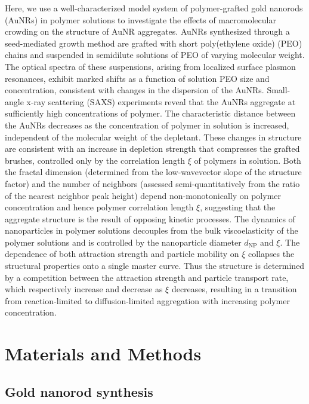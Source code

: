 \documentclass[journal=jacsat, superscriptaddress]{achemso}
\begin{document}
Here, we use a well-characterized model system of polymer-grafted gold nanorods (AuNRs) in polymer solutions to investigate the effects of macromolecular crowding on the structure of AuNR aggregates. AuNRs synthesized through a seed-mediated growth method are grafted with short poly(ethylene oxide) (PEO) chains and suspended in semidilute solutions of PEO of varying molecular weight. The optical spectra of these suspensions, arising from localized surface plasmon resonances, exhibit marked shifts as a function of solution PEO size and concentration, consistent with changes in the dispersion of the AuNRs. Small-angle x-ray scattering (SAXS) experiments reveal that the AuNRs aggregate at sufficiently high concentrations of  polymer. The characteristic distance between the AuNRs decreases as the concentration of polymer in solution is increased, independent of the molecular weight of the depletant. These changes in structure are consistent with an increase in depletion strength that compresses the grafted brushes, controlled only by the correlation length $\xi$ of polymers in solution. Both the fractal dimension (determined from the low-wavevector slope of the structure factor) and the number of neighbors (assessed semi-quantitatively from the ratio of the nearest neighbor peak height) depend non-monotonically on polymer concentration and hence polymer correlation length $\xi$, suggesting that the aggregate structure is the result of opposing kinetic processes. The dynamics of nanoparticles in polymer solutions decouples from the bulk viscoelasticity of the polymer solutions and is controlled by the nanoparticle diameter $d_\mathrm{NP}$ and $\xi$.\cite{Cai2011,Poling-Skutvik2015} The dependence of both attraction strength and particle mobility on $\xi$ collapses the structural properties onto a single master curve. Thus the structure is determined by a competition between the attraction strength and particle transport rate, which respectively increase and decrease as $\xi$ decreases, resulting in a transition from reaction-limited to diffusion-limited aggregation with increasing polymer concentration. 

\section{Materials and Methods}

\subsection{\small Gold nanorod synthesis}
\end{document}
